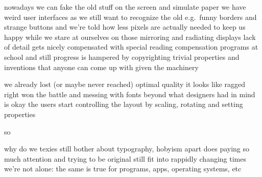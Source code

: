 \stoptopic

\StopSteps

\StartSteps

\starttopic[title=Towards displays]

    \FlushStep

    \startitemize
        \startitem nowadays we can fake the old stuff on the screen and simulate paper \FlushStep \stopitem
        \startitem we have weird user interfaces as we still want to recognize the old e.g.\ funny borders and strange buttons \FlushStep \stopitem
        \startitem and we're told how less pixels are actually needed to keep us happy \FlushStep \stopitem
        \startitem while we stare at ourselves on those mirroring and radiating displays \FlushStep \stopitem
        \startitem lack of detail gets nicely compensated with special reading compensation programs at school \FlushStep \stopitem
        \startitem and still progress is hampered by copyrighting trivial properties and inventions that anyone can come up with given the machinery \FlushStep \stopitem
    \stopitemize

\stoptopic

\StopSteps

\StartSteps

\starttopic[title=The state of affairs]

    \FlushStep

    \startitemize
        \startitem we already lost (or maybe never reached) optimal quality \FlushStep \stopitem
        \startitem it looks like ragged right won the battle \FlushStep \stopitem
        \startitem and messing with fonts beyond what designers had in mind is okay \FlushStep \stopitem
        \startitem the users start controlling the layout by scaling, rotating and setting properties \FlushStep \stopitem
    \stopitemize

    so \FlushStep

    \startitemize
        \startitem why do we texies still bother about typography, hobyism apart \FlushStep \stopitem
        \startitem does paying so much attention and trying to be original still fit into rappidly changing times \FlushStep \stopitem
        \startitem we're not alone: the same is true for programs, apps, operating systems, etc \FlushStep \stopitem
    \stopitemize

\stoptopic

\StopSteps

\StartSteps

\starttopic[title=Take ligatures]

